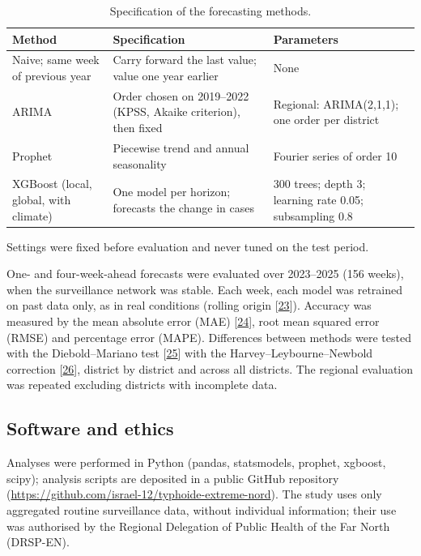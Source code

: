 \documentclass[11pt]{article}
\begin{document}
\begin{table}[!htbp]\centering\small
\caption{Specification of the forecasting methods.}\label{tab:hyper}
\begin{tabularx}{\linewidth}{@{}>{\raggedright\arraybackslash}p{3.6cm} L L@{}}\toprule
Method & Specification & Parameters \\\midrule
Naive; same week of previous year & Carry forward the last value; value one year earlier & None \\
ARIMA & Order chosen on 2019–2022 (KPSS, Akaike criterion), then fixed & Regional: ARIMA(2,1,1); one order per district \\
Prophet & Piecewise trend and annual seasonality & Fourier series of order 10 \\
XGBoost (local, global, with climate) & One model per horizon; forecasts the change in cases & 300 trees; depth 3; learning rate 0.05; subsampling 0.8 \\\bottomrule
\end{tabularx}
\par\smallskip\footnotesize\raggedright Settings were fixed before evaluation and never tuned on the test period.
\end{table}

One- and four-week-ahead forecasts were evaluated over 2023–2025 (156 weeks), when the surveillance network was stable. Each week, each model was retrained on past data only, as in real conditions (rolling origin [\hyperlink{ref23}{23}]). Accuracy was measured by the mean absolute error (MAE) [\hyperlink{ref24}{24}], root mean squared error (RMSE) and percentage error (MAPE). Differences between methods were tested with the Diebold–Mariano test [\hyperlink{ref25}{25}] with the Harvey–Leybourne–Newbold correction [\hyperlink{ref26}{26}], district by district and across all districts. The regional evaluation was repeated excluding districts with incomplete data.

\subsection{Software and ethics}
Analyses were performed in Python (pandas, statsmodels, prophet, xgboost, scipy); analysis scripts are deposited in a public GitHub repository (\url{https://github.com/israel-12/typhoide-extreme-nord}). The study uses only aggregated routine surveillance data, without individual information; their use was authorised by the Regional Delegation of Public Health of the Far North (DRSP-EN).
\end{document}
